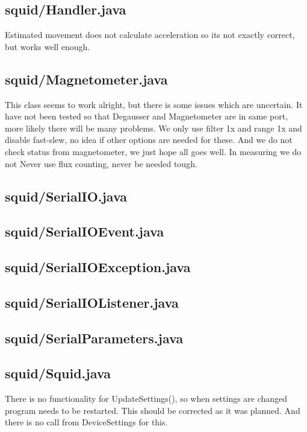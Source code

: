 \subsection{squid/Handler.java}

Estimated movement does not calculate acceleration so its not exactly correct, but works well enough.


\subsection{squid/Magnetometer.java}

This class seems to work alright, but there is some issues which are uncertain. It have not been tested so that Degausser and Magnetometer are in same port, more likely there will be many problems. We only use filter 1x and range 1x and disable fast-slew, no idea if other options are needed for these. And we do not check status from magnetometer, we just hope all goes well. In measuring we do not Never use flux counting, never be needed tough.


\subsection{squid/SerialIO.java}

\subsection{squid/SerialIOEvent.java}

\subsection{squid/SerialIOException.java}

\subsection{squid/SerialIOListener.java}

\subsection{squid/SerialParameters.java}

\subsection{squid/Squid.java}

There is no functionality for UpdateSettings(), so when settings are changed program needs to be restarted. This should be corrected as it was planned. And there is no call from DeviceSettings for this.


